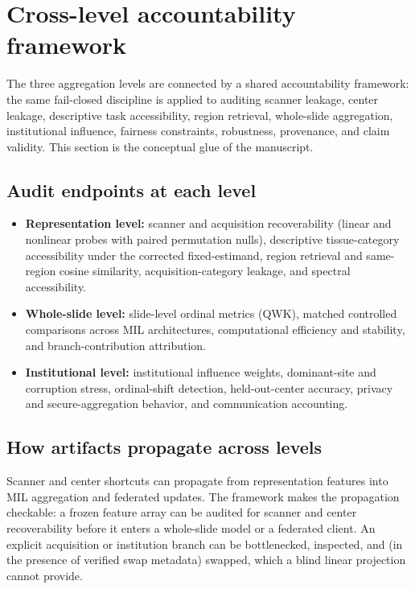 \section{Cross-level accountability framework}

The three aggregation levels are connected by a shared accountability framework:
the same fail-closed discipline is applied to auditing scanner leakage, center
leakage, descriptive task accessibility, region retrieval, whole-slide
aggregation, institutional influence, fairness constraints, robustness,
provenance, and claim validity. This section is the conceptual glue of the
manuscript.

\subsection{Audit endpoints at each level}

\begin{itemize}
\item \textbf{Representation level:} scanner and acquisition recoverability
  (linear and nonlinear probes with paired permutation nulls), descriptive
  tissue-category accessibility under the corrected fixed-estimand, region
  retrieval and same-region cosine similarity, acquisition-category leakage, and
  spectral accessibility.
\item \textbf{Whole-slide level:} slide-level ordinal metrics (QWK), matched
  controlled comparisons across MIL architectures, computational efficiency and
  stability, and branch-contribution attribution.
\item \textbf{Institutional level:} institutional influence weights,
  dominant-site and corruption stress, ordinal-shift detection, held-out-center
  accuracy, privacy and secure-aggregation behavior, and communication
  accounting.
\end{itemize}

\subsection{How artifacts propagate across levels}

Scanner and center shortcuts can propagate from representation features into MIL
aggregation and federated updates. The framework makes the propagation
checkable: a frozen feature array can be audited for scanner and center
recoverability before it enters a whole-slide model or a federated client. An
explicit acquisition or institution branch can be bottlenecked, inspected, and
(in the presence of verified swap metadata) swapped, which a blind linear
projection cannot provide.

